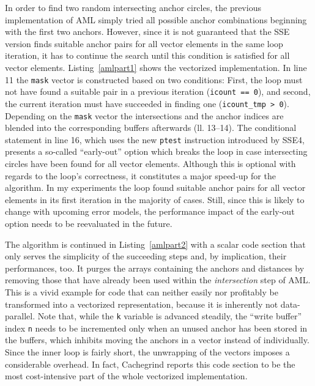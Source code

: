 
In order to find two random intersecting anchor circles, the previous implementation of AML simply tried all possible anchor combinations beginning with the first two anchors. However, since it is not guaranteed that the SSE version finds suitable anchor pairs for all vector elements in the same loop iteration, it has to continue the search until this condition is satisfied for all vector elements. Listing~\ref{amlpart1} shows the vectorized implementation. In line 11 the \texttt{mask} vector is constructed based on two conditions: First, the loop must not have found a suitable pair in a previous iteration (\texttt{icount == 0}), and second, the current iteration must have succeeded in finding one (\texttt{icount\_tmp > 0}). Depending on the \texttt{mask} vector the intersections and the anchor indices are blended into the corresponding buffers afterwards (ll. 13--14). The conditional statement in line 16, which uses the new \texttt{ptest} instruction introduced by SSE4, presents a so-called ``early-out'' option which breaks the loop in case intersecting circles have been found for all vector elements. Although this is optional with regards to the loop's correctness, it constitutes a major speed-up for the algorithm. In my experiments the loop found suitable anchor pairs for all vector elements in its first iteration in the majority of cases. Still, since this is likely to change with upcoming error models, the performance impact of the early-out option needs to be reevaluated in the future.


The algorithm is continued in Listing~\ref{amlpart2} with a scalar code section that only serves the simplicity of the succeeding steps and, by implication, their performances, too. It purges the arrays containing the anchors and distances by removing those that have already been used within the \emph{intersection} step of AML. This is a vivid example for code that can neither easily nor profitably be transformed into a vectorized representation, because it is inherently not data-parallel. Note that, while the \texttt{k} variable is advanced steadily, the ``write buffer'' index \texttt{n} needs to be incremented only when an unused anchor has been stored in the buffers, which inhibits moving the anchors in a vector instead of individually. Since the inner loop is fairly short, the unwrapping of the vectors imposes a considerable overhead. In fact, Cachegrind reports this code section to be the most cost-intensive part of the whole vectorized implementation.

